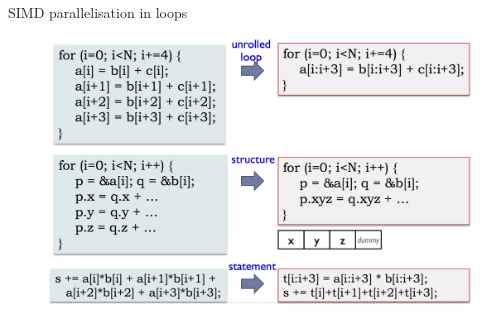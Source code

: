 \documentclass[10pt,times]{beamer}
\begin{document}
\begin{frame}{SIMD parallelisation in loops}
\begin{figure}
\includegraphics[width=\linewidth]{figs/simd_parallelisation.png}
\end{figure}
\end{frame}



\end{document}

